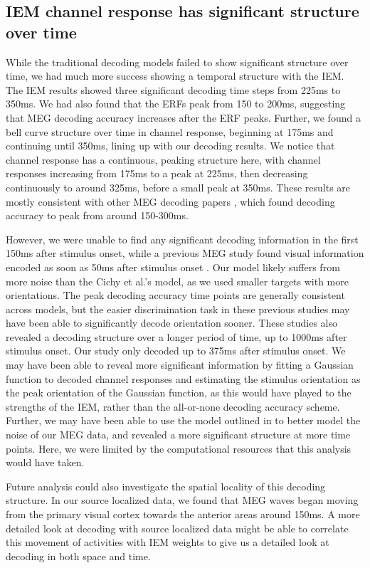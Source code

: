 \documentclass[../main.tex]{subfiles}
\begin{document}
\subsection*{IEM channel response has significant structure over time}
While the traditional decoding models failed to show significant structure over time, we had much more success showing a temporal structure with the IEM. The IEM results showed three significant decoding time steps from 225ms to 350ms. We had also found that the ERFs peak from 150 to 200ms, suggesting that MEG decoding accuracy increases after the ERF peaks. Further, we found a bell curve structure over time in channel response, beginning at 175ms and continuing until 350ms, lining up with our decoding results. We notice that channel response has a continuous, peaking structure here, with channel responses increasing from 175ms to a peak at 225ms, then decreasing continuously to around 325ms, before a small peak at 350ms. These results are mostly consistent with other MEG decoding papers \citep{cichy_ramirez_pantazis_2015, pantazis_fang_qin_mohsenzadeh_li_cichy_2018}, which found decoding accuracy to peak from around 150-300ms.

However, we were unable to find any significant decoding information in the first 150ms after stimulus onset, while a previous MEG study found visual information encoded as soon as 50ms after stimulus onset \citep{cichy_ramirez_pantazis_2015}. Our model likely suffers from more noise than the Cichy et al.'s model, as we used smaller targets with more orientations. The peak decoding accuracy time points are generally consistent across models, but the easier discrimination task in these previous studies may have been able to significantly decode orientation sooner. These studies also revealed a decoding structure over a longer period of time, up to 1000ms after stimulus onset. Our study only decoded up to 375ms after stimulus onset. We may have been able to reveal more significant information by fitting a Gaussian function to decoded channel responses and estimating the stimulus orientation as the peak orientation of the Gaussian function, as this would have played to the strengths of the IEM, rather than the all-or-none decoding accuracy scheme. Further, we may have been able to use the model outlined in \cite{vanBergen} to better model the noise of our MEG data, and revealed a more significant structure at more time points. Here, we were limited by the computational resources that this analysis would have taken.

Future analysis could also investigate the spatial locality of this decoding structure. In our source localized data, we found that MEG waves began moving from the primary visual cortex towards the anterior areas around 150ms. A more detailed look at decoding with source localized data might be able to correlate this movement of activities with IEM weights to give us a detailed look at decoding in both space and time.
\end{document}
